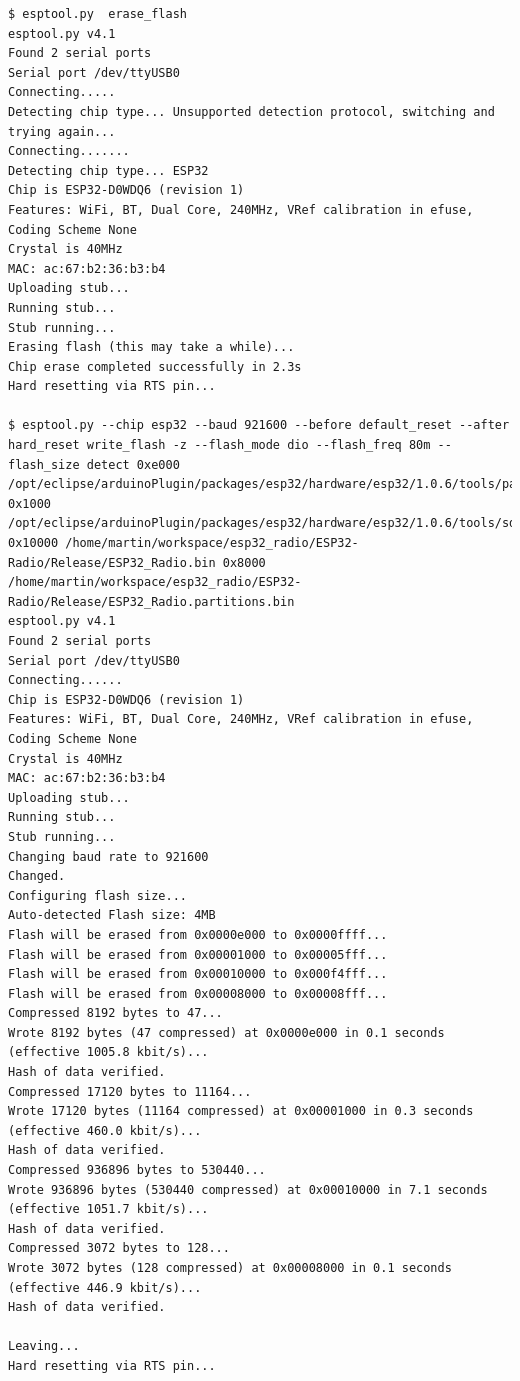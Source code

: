 \documentclass[ngerman,11pt,parskip=half] {scrartcl}
\begin{document}
\begin{lstlisting}
$ esptool.py  erase_flash
esptool.py v4.1
Found 2 serial ports
Serial port /dev/ttyUSB0
Connecting.....
Detecting chip type... Unsupported detection protocol, switching and trying again...
Connecting.......
Detecting chip type... ESP32
Chip is ESP32-D0WDQ6 (revision 1)
Features: WiFi, BT, Dual Core, 240MHz, VRef calibration in efuse, Coding Scheme None
Crystal is 40MHz
MAC: ac:67:b2:36:b3:b4
Uploading stub...
Running stub...
Stub running...
Erasing flash (this may take a while)...
Chip erase completed successfully in 2.3s
Hard resetting via RTS pin...

$ esptool.py --chip esp32 --baud 921600 --before default_reset --after hard_reset write_flash -z --flash_mode dio --flash_freq 80m --flash_size detect 0xe000 /opt/eclipse/arduinoPlugin/packages/esp32/hardware/esp32/1.0.6/tools/partitions/boot_app0.bin 0x1000 /opt/eclipse/arduinoPlugin/packages/esp32/hardware/esp32/1.0.6/tools/sdk/bin/bootloader_dio_80m.bin 0x10000 /home/martin/workspace/esp32_radio/ESP32-Radio/Release/ESP32_Radio.bin 0x8000 /home/martin/workspace/esp32_radio/ESP32-Radio/Release/ESP32_Radio.partitions.bin 
esptool.py v4.1
Found 2 serial ports
Serial port /dev/ttyUSB0
Connecting......
Chip is ESP32-D0WDQ6 (revision 1)
Features: WiFi, BT, Dual Core, 240MHz, VRef calibration in efuse, Coding Scheme None
Crystal is 40MHz
MAC: ac:67:b2:36:b3:b4
Uploading stub...
Running stub...
Stub running...
Changing baud rate to 921600
Changed.
Configuring flash size...
Auto-detected Flash size: 4MB
Flash will be erased from 0x0000e000 to 0x0000ffff...
Flash will be erased from 0x00001000 to 0x00005fff...
Flash will be erased from 0x00010000 to 0x000f4fff...
Flash will be erased from 0x00008000 to 0x00008fff...
Compressed 8192 bytes to 47...
Wrote 8192 bytes (47 compressed) at 0x0000e000 in 0.1 seconds (effective 1005.8 kbit/s)...
Hash of data verified.
Compressed 17120 bytes to 11164...
Wrote 17120 bytes (11164 compressed) at 0x00001000 in 0.3 seconds (effective 460.0 kbit/s)...
Hash of data verified.
Compressed 936896 bytes to 530440...
Wrote 936896 bytes (530440 compressed) at 0x00010000 in 7.1 seconds (effective 1051.7 kbit/s)...
Hash of data verified.
Compressed 3072 bytes to 128...
Wrote 3072 bytes (128 compressed) at 0x00008000 in 0.1 seconds (effective 446.9 kbit/s)...
Hash of data verified.

Leaving...
Hard resetting via RTS pin...
\end{lstlisting}
\end{document}

